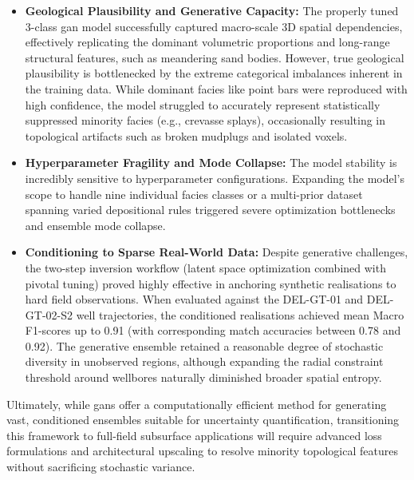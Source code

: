 \begin{itemize}
    \item \textbf{Geological Plausibility and Generative Capacity:} The properly tuned 3-class \gls{gan} model successfully captured macro-scale 3D spatial dependencies, effectively replicating the dominant volumetric proportions and long-range structural features, such as meandering sand bodies. However, true geological plausibility is bottlenecked by the extreme categorical imbalances inherent in the training data. While dominant facies like point bars were reproduced with high confidence, the model struggled to accurately represent statistically suppressed minority facies (e.g., crevasse splays), occasionally resulting in topological artifacts such as broken mudplugs and isolated voxels.
    \item \textbf{Hyperparameter Fragility and Mode Collapse:} The model stability is incredibly sensitive to hyperparameter configurations. Expanding the model's scope to handle nine individual facies classes or a multi-prior dataset spanning varied depositional rules triggered severe optimization bottlenecks and ensemble mode collapse.
    \item \textbf{Conditioning to Sparse Real-World Data:} Despite generative challenges, the two-step inversion workflow (latent space optimization combined with pivotal tuning) proved highly effective in anchoring synthetic realisations to hard field observations. When evaluated against the DEL-GT-01 and DEL-GT-02-S2 well trajectories, the conditioned realisations achieved mean Macro F1-scores up to 0.91 (with corresponding match accuracies between 0.78 and 0.92). The generative ensemble retained a reasonable degree of stochastic diversity in unobserved regions, although expanding the radial constraint threshold around wellbores naturally diminished broader spatial entropy.
\end{itemize}

Ultimately, while \glspl{gan} offer a computationally efficient method for generating vast, conditioned ensembles suitable for uncertainty quantification, transitioning this framework to full-field subsurface applications will require advanced loss formulations and architectural upscaling to resolve minority topological features without sacrificing stochastic variance.
